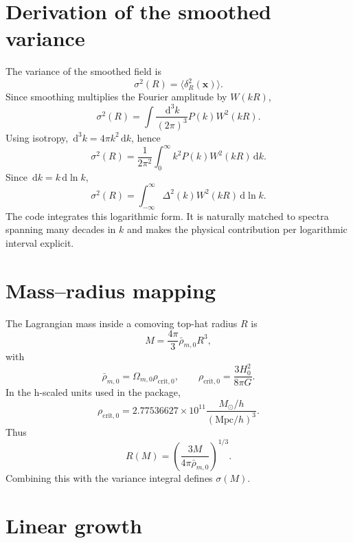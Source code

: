 \documentclass[11pt]{article}
\newcommand{\dd}{\,\mathrm d}
\newcommand{\rhobar}{\bar{\rho}_{m,0}}
\newcommand{\Mpc}{\mathrm{Mpc}}
\newcommand{\Msun}{M_\odot}
\begin{document}
\section{Derivation of the smoothed variance}

The variance of the smoothed field is
\begin{equation}
\sigma^2(R)=\langle \delta_R^2(\bm x)\rangle.
\end{equation}
Since smoothing multiplies the Fourier amplitude by $W(kR)$,
\begin{equation}
\sigma^2(R)=\int\frac{\dd^3k}{(2\pi)^3}P(k)W^2(kR).
\end{equation}
Using isotropy, $\dd^3k=4\pi k^2\dd k$, hence
\begin{equation}
\boxed{\sigma^2(R)=\frac{1}{2\pi^2}\int_0^\infty k^2P(k)W^2(kR)\dd k}.
\end{equation}
Since $\dd k=k\dd\ln k$,
\begin{equation}
\boxed{\sigma^2(R)=\int_{-\infty}^{\infty}\Delta^2(k)W^2(kR)\dd\ln k}.
\end{equation}
The code integrates this logarithmic form. It is naturally matched to spectra spanning many decades in $k$ and makes the physical contribution per logarithmic interval explicit.

\section{Mass--radius mapping}

The Lagrangian mass inside a comoving top-hat radius $R$ is
\begin{equation}
\boxed{M=\frac{4\pi}{3}\rhobar R^3},
\end{equation}
with
\begin{equation}
\rhobar=\Omega_{m,0}\rho_{\mathrm{crit},0},
\qquad
\rho_{\mathrm{crit},0}=\frac{3H_0^2}{8\pi G}.
\end{equation}
In the h-scaled units used in the package,
\begin{equation}
\rho_{\mathrm{crit},0}=2.77536627\times10^{11}
\frac{\Msun/h}{(\Mpc/h)^3}.
\end{equation}
Thus
\begin{equation}
\boxed{R(M)=\left(\frac{3M}{4\pi\rhobar}\right)^{1/3}}.
\end{equation}
Combining this with the variance integral defines $\sigma(M)$.

\section{Linear growth}
\end{document}
